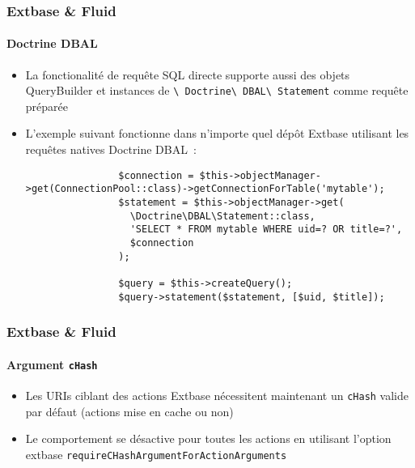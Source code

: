 \begin{frame}[fragile]
	\frametitle{Extbase \& Fluid}
	\framesubtitle{Doctrine DBAL}

	\lstset{basicstyle=\tiny\ttfamily}

	\begin{itemize}
		\item La fonctionalité de requête SQL directe supporte aussi des objets
			QueryBuilder et instances de
			\texttt{\textbackslash
			Doctrine\textbackslash
			DBAL\textbackslash
			Statement} comme requête préparée
		\item L'exemple suivant fonctionne dans n'importe quel dépôt Extbase utilisant les
		 	requêtes natives Doctrine DBAL~:

			\begin{lstlisting}
				$connection = $this->objectManager->get(ConnectionPool::class)->getConnectionForTable('mytable');
				$statement = $this->objectManager->get(
				  \Doctrine\DBAL\Statement::class,
				  'SELECT * FROM mytable WHERE uid=? OR title=?',
				  $connection
				);

				$query = $this->createQuery();
				$query->statement($statement, [$uid, $title]);
			\end{lstlisting}
	\end{itemize}

\end{frame}

\begin{frame}[fragile]
	\frametitle{Extbase \& Fluid}
	\framesubtitle{Argument \texttt{cHash}}

	\begin{itemize}
		\item Les URIs ciblant des actions Extbase nécessitent maintenant un \texttt{cHash} valide par défaut\newline
			(actions mise en cache ou non)
		\item Le comportement se désactive pour toutes les actions en utilisant l'option extbase
			\texttt{requireCHashArgumentForActionArguments}
	\end{itemize}

\end{frame}


